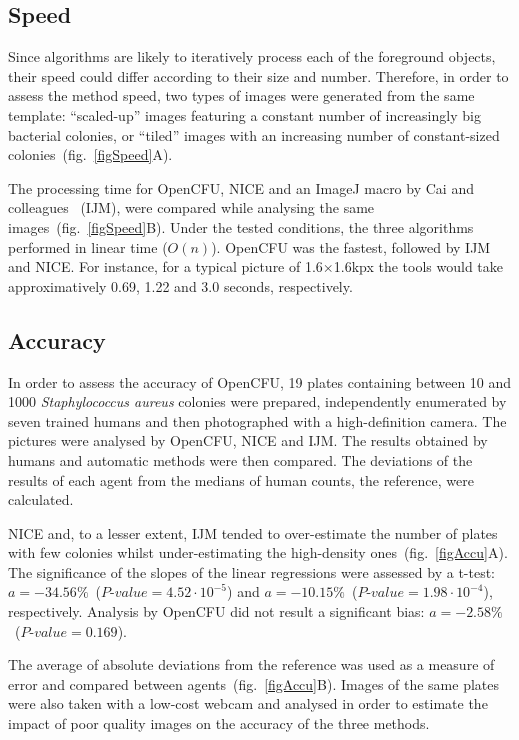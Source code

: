 \documentclass[10pt]{article}
\newcommand{\n}{seven}
\newcommand{\sa}{\emph{Staphylococcus aureus}}
\newcommand{\IJM}{IJM}
\begin{document}
\subsection*{Speed}
Since algorithms are likely to iteratively process each of the foreground
objects, their speed could differ according to their size and number.
Therefore, in order to assess the method speed,  two types of images were
generated from the same template:
``scaled-up'' images featuring a constant number of increasingly big bacterial
colonies, or ``tiled'' images with an increasing number of constant-sized
colonies~(fig.~\ref{figSpeed}A).

The processing time for OpenCFU, NICE\cite{clarke_lowcost_2010} and an ImageJ macro by Cai and colleagues
\cite{cai_optimized_2011}~(\IJM{}),
were compared while analysing the same images~(fig.~\ref{figSpeed}B). Under the
tested conditions, the three algorithms performed in linear time ($O(n)$).
OpenCFU was the fastest, followed by \IJM{} and NICE.
For instance, for a typical picture of 1.6$\times{}$1.6kpx the tools would take
approximatively 0.69, 1.22 and 3.0 seconds, respectively.

\subsection*{Accuracy} 
In order to assess the accuracy of OpenCFU, 19 plates
containing between 10 and 1000 \sa{} colonies were prepared, independently
enumerated by \n{} trained humans and then photographed with a high-definition camera.
The pictures were analysed by OpenCFU, NICE and \IJM{}.
The results obtained by humans and automatic methods were then compared.
The deviations of the results of each
agent from the medians of human counts, the reference, were
calculated.

NICE and, to a lesser extent, \IJM{} tended to over-estimate the number of
plates with few colonies whilst under-estimating the high-density
ones~(fig.~\ref{figAccu}A). The significance of the slopes of the linear
regressions were assessed by a t-test:
$a = -34.56\%$~($P$-$value = 4.52 \cdot 10^{-5}$) and $a = -10.15\%$~($P$-$value =
1.98  \cdot 10^{-4}$), respectively. Analysis by OpenCFU did not result a
significant bias: $a = -2.58\%$~($P$-$value = 0.169$).

The average of absolute deviations from the reference was used
as a measure of error and compared between agents~(fig.~\ref{figAccu}B).
Images of the same plates were also taken with a low-cost webcam and analysed in
order to estimate the impact of poor quality images on the accuracy of the three
methods.
\end{document}
